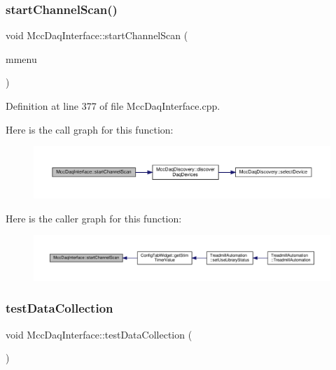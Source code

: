 \subsubsection{\texorpdfstring{start\+Channel\+Scan()}{startChannelScan()}}
{\footnotesize\ttfamily void Mcc\+Daq\+Interface\+::start\+Channel\+Scan (\begin{DoxyParamCaption}\item[{Q\+Menu $\ast$}]{mmenu }\end{DoxyParamCaption})}



Definition at line 377 of file Mcc\+Daq\+Interface.\+cpp.

Here is the call graph for this function\+:
\nopagebreak
\begin{figure}[H]
\begin{center}
\leavevmode
\includegraphics[width=350pt]{class_mcc_daq_interface_a3036cbabc3a63737a96d0ff1fa9ce449_cgraph}
\end{center}
\end{figure}
Here is the caller graph for this function\+:
\nopagebreak
\begin{figure}[H]
\begin{center}
\leavevmode
\includegraphics[width=350pt]{class_mcc_daq_interface_a3036cbabc3a63737a96d0ff1fa9ce449_icgraph}
\end{center}
\end{figure}
\mbox{\label{class_mcc_daq_interface_a19b0dfb99a23e5b296554d2a16f773b2}} 
\subsubsection{\texorpdfstring{test\+Data\+Collection}{testDataCollection}}
{\footnotesize\ttfamily void Mcc\+Daq\+Interface\+::test\+Data\+Collection (\begin{DoxyParamCaption}{ }\end{DoxyParamCaption})\hspace{0.3cm}{\ttfamily [slot]}}



